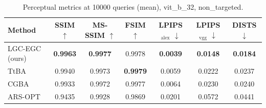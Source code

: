 \begin{table}[t]
\centering\footnotesize
\caption{Perceptual metrics at 10000 queries (mean), vit\_b\_32, non\_targeted.}
\begin{tabular}{lcccccc}
\toprule
Method & SSIM $\uparrow$ & MS-SSIM $\uparrow$ & FSIM $\uparrow$ & LPIPS$_{\mathrm{alex}}$ $\downarrow$ & LPIPS$_{\mathrm{vgg}}$ $\downarrow$ & DISTS $\downarrow$ \\
\midrule
LGC-EGC (ours) & \textbf{0.9963} & \textbf{0.9977} & 0.9978 & \textbf{0.0039} & \textbf{0.0148} & \textbf{0.0184} \\
TtBA & 0.9940 & 0.9973 & \textbf{0.9979} & 0.0059 & 0.0222 & 0.0237 \\
CGBA & 0.9933 & 0.9972 & 0.9977 & 0.0064 & 0.0230 & 0.0240 \\
ARS-OPT & 0.9435 & 0.9928 & 0.9869 & 0.0201 & 0.0572 & 0.0441 \\
\bottomrule
\end{tabular}
\end{table}
